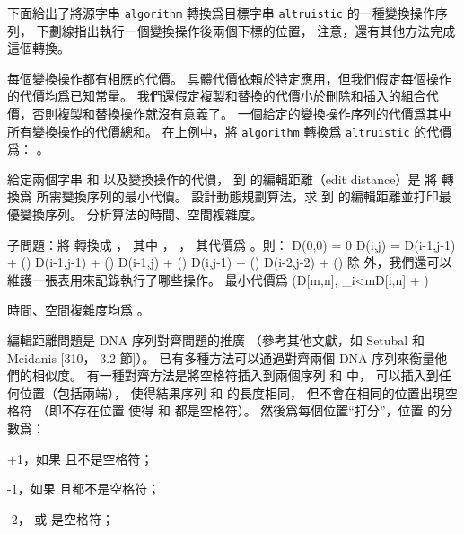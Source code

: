 下面給出了將源字串 {\tt algorithm} 轉換爲目標字串 {\tt altruistic} 的一種變換操作序列，
下劃線指出執行一個變換操作後兩個下標的位置，
注意，還有其他方法完成這個轉換。



每個變換操作都有相應的代價。
具體代價依賴於特定應用，但我們假定每個操作的代價均爲已知常量。
我們還假定複製和替換的代價小於刪除和插入的組合代價，否則複製和替換操作就沒有意義了。
一個給定的變換操作序列的代價爲其中所有變換操作的代價總和。
在上例中，將 {\tt algorithm} 轉換爲 {\tt altruistic} 的代價爲：
。

\startigNum
\startitem
給定兩個字串  和  以及變換操作的代價，
  到  的{\EMP 編輯距離}（edit distance）是
將  轉換爲  所需變換序列的最小代價。
設計動態規劃算法，求  到  的編輯距離並打印最優變換序列。
分析算法的時間、空間複雜度。
\stopitem
\stopigNum

\startANSWER
子問題：將  轉換成 ，
其中 ， ，
其代價爲 。則：
\startformula\startmathalignment
\NC D(0,0) \NC = 0 \NR
\NC D(i,j) \NC = \min\startcases
\NC D(i-1,j-1) + \COST() \MC {}\NR
\NC D(i-1,j-1) + \COST() \MC {}\NR
\NC D(i-1,j) + \COST() \MC \NR
\NC D(i,j-1) + \COST() \MC \NR
\NC D(i-2,j-2) + \COST() \MC {}\NR
\stopcases \NR
\stopmathalignment\stopformula
除  外，我們還可以維護一張表用來記錄執行了哪些操作。
最小代價爲
\startformula
\min(D[m,n], \min_{i<m}D[i,n] + \COST[\text{終止}])
\stopformula

時間、空間複雜度均爲 。
\stopANSWER

編輯距離問題是 DNA 序列對齊問題的推廣
（參考其他文獻，如 Setubal 和 Meidanis [310， 3.2 節]）。
已有多種方法可以通過對齊兩個 DNA 序列來衡量他們的相似度。
有一種對齊方法是將空格符插入到兩個序列  和  中，
可以插入到任何位置（包括兩端），
使得結果序列  和  的長度相同，
但不會在相同的位置出現空格符
（即不存在位置  使得  和  都是空格符）。
然後爲每個位置“打分”，位置  的分數爲：
\startigBase
\item +1，如果  且不是空格符；
\item -1，如果  且都不是空格符；
\item -2，  或  是空格符；
\stopigBase

